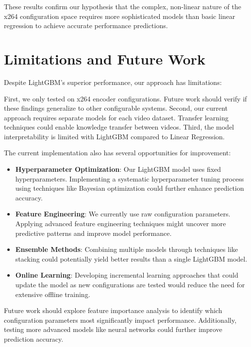 \documentclass[10pt]{article}
\begin{document}
These results confirm our hypothesis that the complex, non-linear nature of the x264 configuration space requires more sophisticated models than basic linear regression to achieve accurate performance predictions.


\section{Limitations and Future Work}
Despite LightGBM's superior performance, our approach has limitations:

First, we only tested on x264 encoder configurations. Future work should verify if these findings generalize to other configurable systems. Second, our current approach requires separate models for each video dataset. Transfer learning techniques could enable knowledge transfer between videos. Third, the model interpretability is limited with LightGBM compared to Linear Regression.

The current implementation also has several opportunities for improvement:

\begin{itemize}
\item \textbf{Hyperparameter Optimization}: Our LightGBM model uses fixed hyperparameters. Implementing a systematic hyperparameter tuning process using techniques like Bayesian optimization could further enhance prediction accuracy.

\item \textbf{Feature Engineering}: We currently use raw configuration parameters. Applying advanced feature engineering techniques might uncover more predictive patterns and improve model performance.

\item \textbf{Ensemble Methods}: Combining multiple models through techniques like stacking could potentially yield better results than a single LightGBM model.

\item \textbf{Online Learning}: Developing incremental learning approaches that could update the model as new configurations are tested would reduce the need for extensive offline training.
\end{itemize}

Future work should explore feature importance analysis to identify which configuration parameters most significantly impact performance. Additionally, testing more advanced models like neural networks could further improve prediction accuracy.
\end{document}
